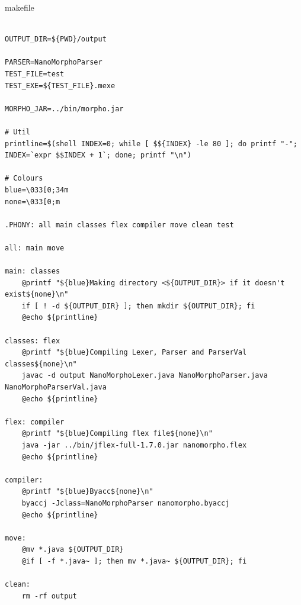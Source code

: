 \documentclass{homework}
\begin{document}
\begin{question}{makefile}
\end{question}
\begin{answer}
  \begin{verbatim}

OUTPUT_DIR=${PWD}/output

PARSER=NanoMorphoParser
TEST_FILE=test
TEST_EXE=${TEST_FILE}.mexe

MORPHO_JAR=../bin/morpho.jar

# Util
printline=$(shell INDEX=0; while [ $${INDEX} -le 80 ]; do printf "-"; INDEX=`expr $$INDEX + 1`; done; printf "\n")

# Colours
blue=\033[0;34m
none=\033[0;m

.PHONY: all main classes flex compiler move clean test

all: main move

main: classes
	@printf "${blue}Making directory <${OUTPUT_DIR}> if it doesn't exist${none}\n"
	if [ ! -d ${OUTPUT_DIR} ]; then mkdir ${OUTPUT_DIR}; fi
	@echo ${printline}

classes: flex
	@printf "${blue}Compiling Lexer, Parser and ParserVal classes${none}\n"
	javac -d output NanoMorphoLexer.java NanoMorphoParser.java NanoMorphoParserVal.java
	@echo ${printline}

flex: compiler
	@printf "${blue}Compiling flex file${none}\n"
	java -jar ../bin/jflex-full-1.7.0.jar nanomorpho.flex
	@echo ${printline}

compiler:
	@printf "${blue}Byacc${none}\n"
	byaccj -Jclass=NanoMorphoParser nanomorpho.byaccj
	@echo ${printline}

move:
	@mv *.java ${OUTPUT_DIR}
	@if [ -f *.java~ ]; then mv *.java~ ${OUTPUT_DIR}; fi

clean:
	rm -rf output


\end{verbatim}
\end{answer}
\end{document}

